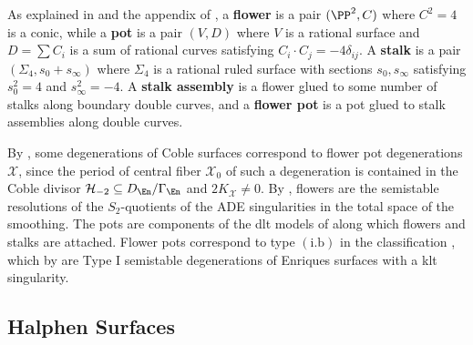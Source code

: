 \documentclass[../main.tex]{subfiles}
\begin{document}
\begin{remark}
As explained in \cite{Mor81} and the appendix of \cite{Sha81}, a \textbf{flower} is a pair $(\PP^2, C)$ where $C^2 = 4$ is a conic, while a \textbf{pot} is a pair $(V, D)$ where $V$ is a rational surface and $D = \sum C_i$ is a sum of rational curves satisfying $C_i\cdot C_j = -4\delta_{ij}$. A \textbf{stalk} is a pair $(\Sigma_4, s_0 + s_\infty)$ where $\Sigma_4$ is a rational ruled surface with sections $s_0, s_\infty$ satisfying $s_0^2 = 4$ and $s_\infty^2 = -4$. A \textbf{stalk assembly} is a flower glued to some number of stalks along boundary double curves, and a \textbf{flower pot} is a pot glued to stalk assemblies along double curves.

By \cite[Lem. 7.1, 7.2]{Mor81}, some degenerations of Coble surfaces correspond to flower pot degenerations $\mathcal{X}$, since the period of central fiber $\mathcal{X}_0$ of such a degeneration is contained in the Coble divisor $\mathcal{H}_{-2} \subseteq D_\En/\Gamma_{\En}$ and $2K_{\mathcal{X}}\neq 0$. By \cite{AEGS23}, flowers are the semistable resolutions of the $S_2$-quotients of the ADE singularities in the total space of the smoothing. The pots are components of the dlt models of \cite{AEGS23} along which flowers and stalks are attached. Flower pots correspond to type $\mathrm{(i.b)}$ in the classification \cite[Cor. 6.2]{Mor81}, which by \cite[Rmk. 4.12]{AEGS23} are Type $\mathrm{I}$ semistable degenerations of Enriques surfaces with a klt singularity.
\end{remark}

\subsection{Halphen Surfaces}
\end{document}
